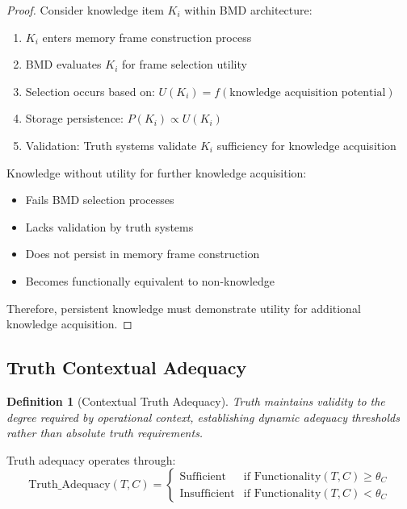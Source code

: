 \documentclass[12pt,a4paper]{article}
\newtheorem{definition}[theorem]{Definition}
\begin{document}
\begin{proof}
Consider knowledge item $K_i$ within BMD architecture:
\begin{enumerate}
\item $K_i$ enters memory frame construction process
\item BMD evaluates $K_i$ for frame selection utility
\item Selection occurs based on: $U(K_i) = f(\text{knowledge acquisition potential})$
\item Storage persistence: $P(K_i) \propto U(K_i)$
\item Validation: Truth systems validate $K_i$ sufficiency for knowledge acquisition
\end{enumerate}

Knowledge without utility for further knowledge acquisition:
\begin{itemize}
\item Fails BMD selection processes
\item Lacks validation by truth systems
\item Does not persist in memory frame construction
\item Becomes functionally equivalent to non-knowledge
\end{itemize}

Therefore, persistent knowledge must demonstrate utility for additional knowledge acquisition.
\end{proof}

\subsection{Truth Contextual Adequacy}

\begin{definition}[Contextual Truth Adequacy]
Truth maintains validity to the degree required by operational context, establishing dynamic adequacy thresholds rather than absolute truth requirements.
\end{definition}

Truth adequacy operates through:
\begin{equation}
\text{Truth\_Adequacy}(T, C) = \begin{cases} 
\text{Sufficient} & \text{if } \text{Functionality}(T, C) \geq \theta_C \\
\text{Insufficient} & \text{if } \text{Functionality}(T, C) < \theta_C
\end{cases}
\end{equation}
\end{document}
